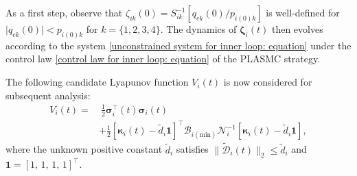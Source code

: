 \documentclass[lettersize,journal]{IEEEtran}
\begin{document}
As a first step, observe that $\zeta_{i k}(0) = S_{i k}^{-1} [q_{e k}(0) / p_{i (0) k}]$ is well-defined for $\lvert q_{e k}(0) \rvert < p_{i (0) k}$ for $k = \{1, 2, 3, 4\}$. The dynamics of $\boldsymbol{\zeta}_i(t)$ then evolves according to the system \eqref{unconstrained system for inner loop: equation} under the control law \eqref{control law for inner loop: equation} of the PLASMC strategy.

\noindent The following candidate Lyapunov function $V_i(t)$ is now considered for subsequent analysis:
\begin{align} \label{Lyapunov function for inner loop: equation}
    V_i(t) =&~ \frac{1}{2}\boldsymbol{\sigma}_i^{\top}(t)\boldsymbol{\sigma}_i(t) \nonumber \\
    &+ \frac{1}{2} \left[\boldsymbol{\kappa}_i(t) - \tilde{d}_{i} \boldsymbol{1}\right]^{\top} \mathcal{B}_{i (\text{min})} \mathcal{N}_i^{-1} \left[\boldsymbol{\kappa}_i(t) - \tilde{d}_{i} \boldsymbol{1}\right],
\end{align}
where the unknown positive constant $\tilde{d}_{i}$ satisfies $\lVert\tilde{\mathcal{D}}_i(t)\rVert_2 \leq \tilde{d}_i$ and $\boldsymbol{1} = [1,\,1,\,1,\,1]^{\top}$.
\end{document}
